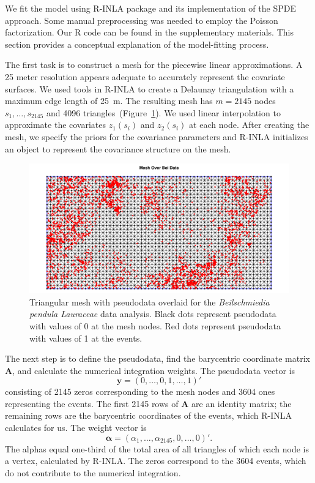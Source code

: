 \documentclass{interact}
\begin{document}
We fit the model using R-INLA package and its implementation of
the SPDE approach. Some manual preprocessing was needed to employ the Poisson
factorization. Our R code can be found in the supplementary materials. This
section provides a conceptual explanation of the model-fitting process.

The first task is to construct a mesh for the piecewise linear approximations.
A 25 meter resolution appears adequate to accurately represent the covariate
surfaces. We used tools in R-INLA to create a Delaunay
triangulation with a maximum edge length of 25~m. The resulting mesh has
\(m = 2145\) nodes \(s_{1},  \dots, s_{2145}\) and 4096
triangles~(Figure~\ref{beimesh}). We used linear interpolation to approximate
the covariates \(z_{1}(s_{i})\) and \(z_{2}(s_{i})\) at each node. After
creating the mesh, we specify the priors for the covariance parameters and
R-INLA initializes an object to represent the covariance structure
on the mesh.

\begin{figure}[t!]\centering
\includegraphics[width=\textwidth]{figures/bei_mesh.pdf}
\caption{Triangular mesh with pseudodata overlaid for the \emph{Beilschmiedia
pendula Lauraceae} data analysis. Black dots represent pseudodata with values
of 0 at the mesh nodes. Red dots represent pseudodata with values of 1 at the
events.}
\label{beimesh}
\end{figure}

The next step is to define the pseudodata, find the barycentric coordinate
matrix \(\mathbf{A}\), and calculate the numerical integration weights. The
pseudodata vector is
\begin{equation}
\mathbf{y} = (0, \dots, 0, 1, \dots, 1)'
\end{equation}
consisting of 2145 zeros corresponding to the mesh nodes and 3604 ones
representing the events. The first 2145 rows of \(\mathbf{A}\) are an
identity matrix; the remaining rows are the barycentric coordinates of the
events, which R-INLA calculates for us. The weight vector is
\begin{equation}
\boldsymbol{\alpha} = (\alpha_{1}, \dots, \alpha_{2145}, 0, \dots, 0)'.
\end{equation}
The alphas equal one-third of the total area of all triangles of which each
node is a vertex, calculated by R-INLA. The zeros correspond to the
3604 events, which do not contribute to the numerical integration.
\end{document}
